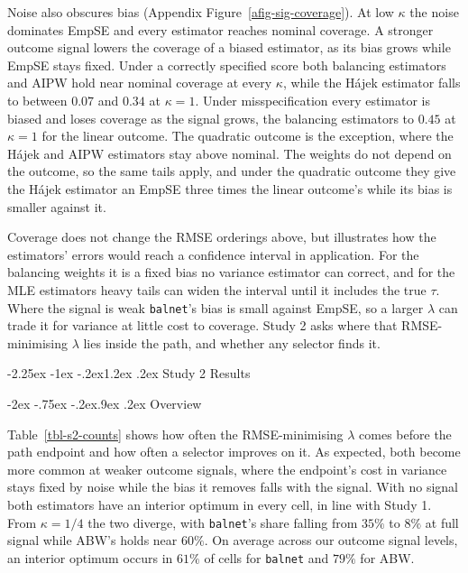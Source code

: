 \documentclass[
  12pt,
  a4paper,
]{article}
\makeatletter
\renewcommand\section{\@startsection{section}{1}{\z@}%
  {-2.25ex \@plus -1ex \@minus -.2ex}{1.2ex \@plus .2ex}%
  {\normalfont\Large\bfseries}}
\renewcommand\subsection{\@startsection{subsection}{2}{\z@}%
  {-2ex \@plus -.75ex \@minus -.2ex}{.9ex \@plus .2ex}%
  {\normalfont\large\bfseries}}
\makeatother
\begin{document}
Noise also obscures bias (Appendix Figure~\ref{afig-sig-coverage}). At
low \(\kappa\) the noise dominates EmpSE and every estimator reaches
nominal coverage. A stronger outcome signal lowers the coverage of a
biased estimator, as its bias grows while EmpSE stays fixed. Under a
correctly specified score both balancing estimators and AIPW hold near
nominal coverage at every \(\kappa\), while the Hájek estimator falls to
between \(0.07\) and \(0.34\) at \(\kappa = 1\). Under misspecification
every estimator is biased and loses coverage as the signal grows, the
balancing estimators to \(0.45\) at \(\kappa = 1\) for the linear
outcome. The quadratic outcome is the exception, where the Hájek and
AIPW estimators stay above nominal. The weights do not depend on the
outcome, so the same tails apply, and under the quadratic outcome they
give the Hájek estimator an EmpSE three times the linear outcome's while
its bias is smaller against it.

Coverage does not change the RMSE orderings above, but illustrates how
the estimators' errors would reach a confidence interval in application.
For the balancing weights it is a fixed bias no variance estimator can
correct, and for the MLE estimators heavy tails can widen the interval
until it includes the true \(\tau\). Where the signal is weak
\texttt{balnet}'s bias is small against EmpSE, so a larger \(\lambda\)
can trade it for variance at little cost to coverage. Study 2 asks where
that RMSE-minimising \(\lambda\) lies inside the path, and whether any
selector finds it.

\section{Study 2 Results}\label{study-2-results}

\subsection{Overview}\label{overview}

Table~\ref{tbl-s2-counts} shows how often the RMSE-minimising
\(\lambda\) comes before the path endpoint and how often a selector
improves on it. As expected, both become more common at weaker outcome
signals, where the endpoint's cost in variance stays fixed by noise
while the bias it removes falls with the signal. With no signal both
estimators have an interior optimum in every cell, in line with Study 1.
From \(\kappa = 1/4\) the two diverge, with \texttt{balnet}'s share
falling from \(35\%\) to \(8\%\) at full signal while ABW's holds near
\(60\%\). On average across our outcome signal levels, an interior
optimum occurs in \(61\%\) of cells for \texttt{balnet} and \(79\%\) for
ABW.
\end{document}
